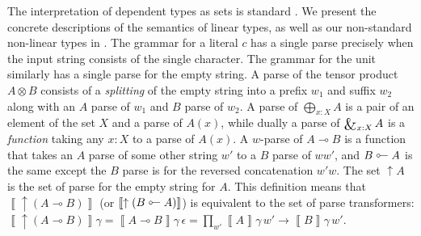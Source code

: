 \documentclass[acmsmall,nonacm]{acmart}
\newcommand{\sem}[1]{\left\llbracket{#1}\right\rrbracket}
\newcommand{\lto}{\multimap}
\newcommand{\tol}{\mathrel{\rotatebox[origin=c]{180}{$\lto$}}}
\DeclareMathOperator*{\bigwith}{\scalerel*{\&}{\bigoplus}}
\begin{document}
{The interpretation of dependent types as sets is standard
\cite{Hofmann_1997}. We present the concrete descriptions of the
semantics of linear types, as well as our non-standard non-linear
types in . The grammar for a literal $c$ has a
single parse precisely when the input string consists of the single
character. The grammar for the unit similarly has a single parse for
the empty string.  A parse of the tensor product $A \otimes B$
consists of a \emph{splitting} of the empty string into a prefix $w_1$
and suffix $w_2$ along with an $A$ parse of $w_1$ and $B$ parse of
$w_2$. A parse of $\bigoplus_{x:X} A$ is a pair of an element of the
set $X$ and a parse of $A(x)$, while dually a parse of $\bigwith_{x:X}
A$ is a \emph{function} taking any $x:X$ to a parse of $A(x)$. A
$w$-parse of $A \lto B$ is a function that takes an $A$ parse of some
other string $w'$ to a $B$ parse of $ww'$, and $B \tol A$ is the same
except the $B$ parse is for the reversed concatenation $w'w$.
%
The set $\uparrow A$ is the set of parse for the empty string for
$A$. This definition means that $\sem{\uparrow (A \lto B)}$ (or $\sem{\uparrow (B \tol A)}$) is
equivalent to the set of parse transformers:
\( \sem{\uparrow (A \lto B)}\gamma = \sem{A \lto B}\gamma\,\epsilon = \prod_{w'} \sem{A}\gamma\,w' \to \sem{B}\gamma\,w'\).

}
\end{document}
